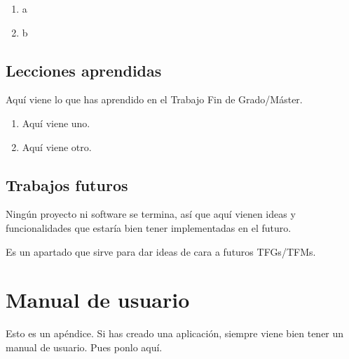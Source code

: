\documentclass[a4paper, 12pt]{book}
\begin{document}
\begin{enumerate}
  \item a
  \item b
\end{enumerate}


\section{Lecciones aprendidas}
\label{sec:lecciones_aprendidas}

Aquí viene lo que has aprendido en el Trabajo Fin de Grado/Máster.

\begin{enumerate}
  \item Aquí viene uno.
  \item Aquí viene otro.
\end{enumerate}


\section{Trabajos futuros}
\label{sec:trabajos_futuros}

Ningún proyecto ni software se termina, así que aquí vienen ideas y funcionalidades que estaría bien tener implementadas en el futuro.

Es un apartado que sirve para dar ideas de cara a futuros TFGs/TFMs.



\cleardoublepage
\appendix
\chapter{Manual de usuario}
\label{app:manual}

Esto es un apéndice.
Si has creado una aplicación, siempre viene bien tener un manual de usuario.
Pues ponlo aquí.


\cleardoublepage


\end{document}
